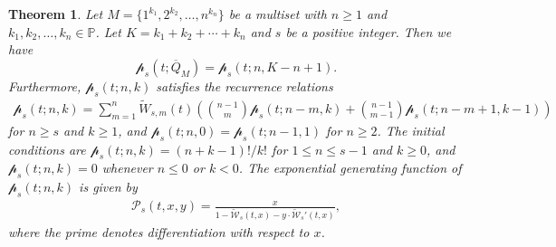 \documentclass[11pt]{article}
\numberwithin{equation}{section}
\newtheorem{thm}{Theorem}[section]
\def\cW{\mathcal{W}}
\def\cP{\mathcal{P}}
\def\oQ{\overline{Q}}
\newcommand{\cp}{\mathcal{p}}
\begin{document}
\begin{thm}\label{THM:enum-p-dis}
	Let $M=\{1^{k_1},2^{k_2},\ldots,n^{k_n}\}$ be a multiset with $n\geq 1$ and $k_1,k_2,\ldots,k_n\in\mathbb P$. Let 
	$K=k_1+k_2+\cdots +k_n$ and $s$ be a positive integer. Then we have
	\[
	\cp_s(t;\oQ_M)=\cp_s(t;n,K-n+1).
	\]
	Furthermore, $\cp_s(t;n,k)$ satisfies the recurrence relations
	\begin{align}\label{EQ:cps-rr}
	\cp_s(t;n,k)=%
	\sum_{m=1}^{n}\tilde{W}_{s,m}(t)\left(\binom{n-1}{m}\cp_s(t;n-m,k)+\binom{n-1}{m-1}\cp_s(t;n-m+1,k-1)\right) 
	\end{align}
	for $n\geq s$ and $k\geq1$, and $\cp_s(t;n,0)=\cp_s(t;n-1,1)$ for $n\geq2$.
	The initial conditions are $\cp_s(t;n,k)=(n+k-1)!/k!$ for $1\leq n\leq s-1$ and $k\geq0$, and $\cp_s(t;n,k)=0$ whenever $n\leq0$ or $k<0$.
	The exponential generating function of $\cp_s(t;n,k)$ is given by
	\begin{align*}
	\cP_s(t,x,y)=\frac{x}{1-\tilde{\cW}_s(t,x)-y\cdot \tilde{\cW}_s'(t,x)},
	\end{align*}
	where the prime denotes differentiation with respect to $x$.
\end{thm}
\end{document}
